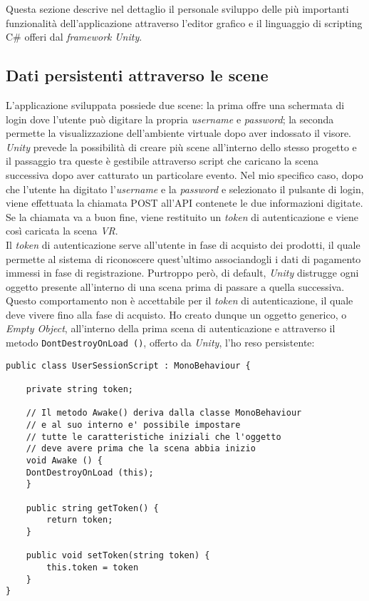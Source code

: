 Questa sezione descrive nel dettaglio il personale sviluppo delle più importanti funzionalità dell'applicazione attraverso l'editor grafico e il linguaggio di scripting C\# offeri dal \textit{framework} \textit{Unity}.


\subsection{Dati persistenti attraverso le scene}

L'applicazione sviluppata possiede due scene: la prima offre una schermata di login dove l'utente può digitare la propria \textit{username} e \textit{password}; la seconda permette la visualizzazione dell'ambiente virtuale dopo aver indossato il visore. \textit{Unity} prevede la possibilità di creare più scene all'interno dello stesso progetto e il passaggio tra queste è gestibile attraverso script che caricano la scena successiva dopo aver catturato un particolare evento. Nel mio specifico caso, dopo che l'utente ha digitato l'\textit{username} e la \textit{password} e selezionato il pulsante di login, viene effettuata la chiamata POST all'API contenete le due informazioni digitate. Se la chiamata va a buon fine, viene restituito un \textit{token} di autenticazione e viene così caricata la scena \textit{VR}. \\
Il \textit{token} di autenticazione serve all'utente in fase di acquisto dei prodotti, il quale permette al sistema di riconoscere quest'ultimo associandogli i dati di pagamento immessi in fase di registrazione. Purtroppo però, di default, \textit{Unity} distrugge ogni oggetto presente all'interno di una scena prima di passare a quella successiva. Questo comportamento non è accettabile per il \textit{token} di autenticazione, il quale deve vivere fino alla fase di acquisto. Ho creato dunque un oggetto generico, o \textit{Empty Object}, all'interno della prima scena di autenticazione e attraverso il metodo \texttt{DontDestroyOnLoad ()}, offerto da \textit{Unity}, l'ho reso persistente:

\begin{lstlisting}[style=MyCStyle]
public class UserSessionScript : MonoBehaviour {

	private string token;

	// Il metodo Awake() deriva dalla classe MonoBehaviour
	// e al suo interno e' possibile impostare
	// tutte le caratteristiche iniziali che l'oggetto
	// deve avere prima che la scena abbia inizio
	void Awake () {
	DontDestroyOnLoad (this);
	}
	
	public string getToken() {
		return token;
	}
	
	public void setToken(string token) {
		this.token = token
	}
}
\end{lstlisting}

